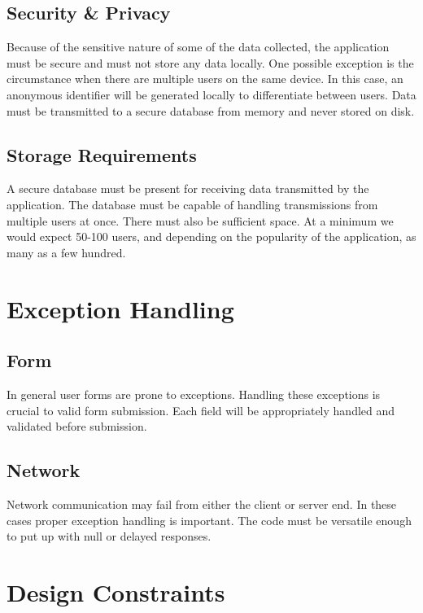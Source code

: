\documentclass[a4wide]{article}
\begin{document}
\subsection{Security \& Privacy}
Because of the sensitive nature of some of the data collected, the application
must be secure and must not store any data locally.  One possible exception is
the circumstance when there are multiple users on the same device.  In this case,
an anonymous identifier will be generated locally to differentiate between
users.  Data must be transmitted to a secure database from memory and never
stored on disk.

\subsection{Storage Requirements}
A secure database must be present for receiving data transmitted by the
application.  The database must be capable of handling transmissions from
multiple users at once.  There must also be sufficient space.  At a minimum we
would expect 50-100 users, and depending on the popularity of the application,
as many as a few hundred.



\section{Exception Handling}

\subsection{Form}

In general user forms are prone to exceptions.
Handling these exceptions is crucial to valid form submission.
Each field will be appropriately handled and validated before submission.

\subsection{Network}

Network communication may fail from either the client or server end.
In these cases proper exception handling is important.
The code must be versatile enough to put up with null or delayed responses.



\section{Design Constraints}
\end{document}
